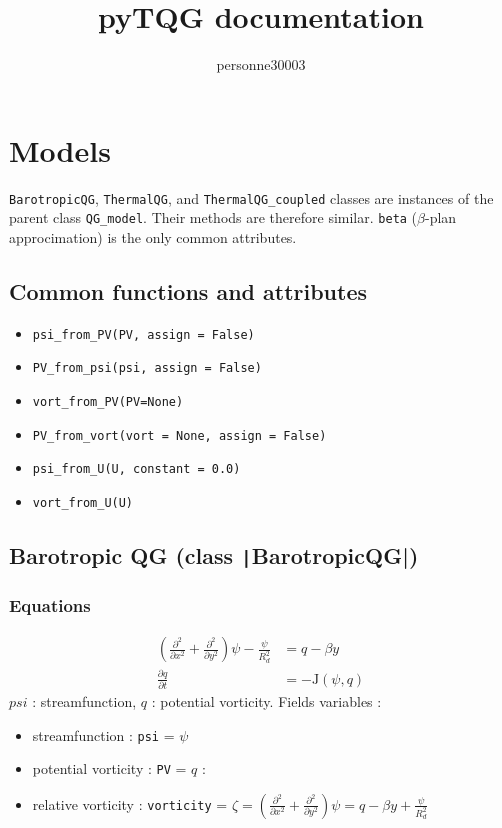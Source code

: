 \documentclass[12pt]{article}
\title{ pyTQG documentation }
\author{personne30003}
\numberwithin{equation}{section}%
\begin{document}
\section{Models}
\verb|BarotropicQG|, \verb|ThermalQG|, and \verb|ThermalQG_coupled| classes are instances of the parent class \verb|QG_model|. Their methods are therefore similar. \verb|beta| ($\beta$-plan approcimation) is the only common attributes.
\subsection{Common functions and attributes}
\begin{itemize}
	\item \verb|psi_from_PV(PV, assign = False)|
	\item \verb|PV_from_psi(psi, assign = False)|
	\item \verb|vort_from_PV(PV=None)|
	\item \verb|PV_from_vort(vort = None, assign = False)|
	\item \verb|psi_from_U(U, constant = 0.0)|
	\item \verb|vort_from_U(U)|
\end{itemize}

\subsection{Barotropic QG (class \texttt|BarotropicQG|)}
\subsubsection{Equations}
\begin{align}
	\left(\frac{\partial^2}{\partial x^2} + \frac{\partial^2}{\partial y^2}\right) \psi - \frac{\psi}{R_d^2} &= q -\beta y \\
	\frac{\partial q}{\partial t} &= -\mathrm{J}(\psi, q)
\end{align}
$psi$ : streamfunction, $q$ : potential vorticity. Fields variables : 
\begin{itemize}
	\item streamfunction : \verb|psi| = $\psi$
	\item potential vorticity : \verb|PV| = $q$ :
	\item relative vorticity : \verb|vorticity| = $\zeta = \left(\frac{\partial^2}{\partial x^2} + \frac{\partial^2}{\partial y^2}\right) \psi = q -\beta y + \frac{\psi}{R_d^2}$
	  
\end{itemize}
\end{document}

